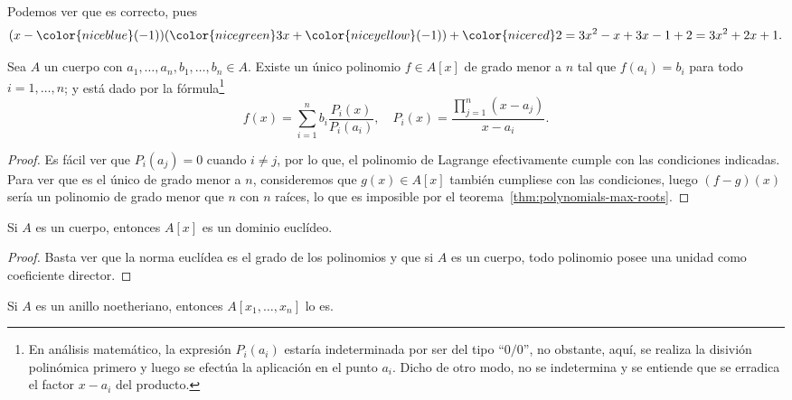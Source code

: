 \documentclass[11pt,oneside]{book}
\begin{document}
Podemos ver que es correcto, pues
$$(x-{\color{niceblue}(-1)})({\color{nicegreen}3}x+{\color{niceyellow}(-1)})+{\color{nicered}2}=3x^2-x+3x-1+2=3x^2+2x+1.$$
\begin{thm}
Sea $A$ un cuerpo con $a_1,\dots,a_n,b_1,\dots,b_n\in A$. Existe un único polinomio $f\in A[x]$ de grado menor a $n$ tal que $f(a_i)=b_i$ para todo $i=1,\dots,n$; y está dado por la fórmula\footnote{En análisis matemático, la expresión $P_i(a_i)$ estaría indeterminada por ser del tipo ``$0/0$'', no obstante, aquí, se realiza la disivión polinómica primero y luego se efectúa la aplicación en el punto $a_i$. Dicho de otro modo, no se indetermina y se entiende que se erradica el factor $x-a_i$ del producto.}
\begin{equation}
f(x)=\sum_{i=1}^nb_i\frac{P_i(x)}{P_i(a_i)},\quad P_i(x)=\frac{\prod_{j=1}^n(x-a_j)}{x-a_i}.
\end{equation}
\end{thm}
\begin{proof}
Es fácil ver que $P_i(a_j)=0$ cuando $i\neq j$, por lo que, el polinomio de Lagrange efectivamente cumple con las condiciones indicadas. Para ver que es el único de grado menor a $n$, consideremos que $g(x)\in A[x]$ también cumpliese con las condiciones, luego $(f-g)(x)$ sería un polinomio de grado menor que $n$ con $n$ raíces, lo que es imposible por el teorema~\ref{thm:polynomials-max-roots}.
\end{proof}
\begin{thm}
Si $A$ es un cuerpo, entonces $A[x]$ es un dominio euclídeo.
\end{thm}
\begin{proof}
Basta ver que la norma euclídea es el grado de los polinomios y que si $A$ es un cuerpo, todo polinomio posee una unidad como coeficiente director.
\end{proof}
\begin{thm}
Si $A$ es un anillo noetheriano, entonces $A[x_1,\dots,x_n]$ lo es.
\end{thm}
\end{document}
